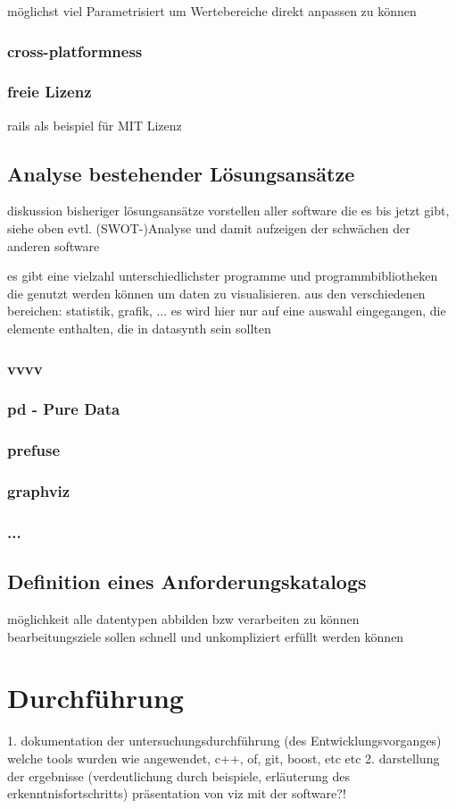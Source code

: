 \documentclass[a4paper, 12pt, onepage, pdftex, headsepline, footsepline]{scrreprt}
\begin{document}
möglichst viel Parametrisiert um Wertebereiche direkt anpassen zu können

\subsection{cross-platformness}
\subsection{freie Lizenz}
rails als beispiel für MIT Lizenz

\section{Analyse bestehender Lösungsansätze}
diskussion bisheriger lösungsansätze
vorstellen aller software die es bis jetzt gibt, siehe oben
evtl. (SWOT-)Analyse und damit aufzeigen der schwächen der anderen software

es gibt eine vielzahl unterschiedlichster programme und programmbibliotheken die genutzt werden können um daten zu visualisieren.
aus den verschiedenen bereichen: statistik, grafik, ...
es wird hier nur auf eine auswahl eingegangen, die elemente enthalten, die in datasynth sein sollten
\subsection{vvvv}
\subsection{pd - Pure Data}
\subsection{prefuse}
\subsection{graphviz}
\subsection{...}
\section{Definition eines Anforderungskatalogs}
möglichkeit alle datentypen abbilden bzw verarbeiten zu können
bearbeitungsziele sollen schnell und unkompliziert erfüllt werden können
\chapter{Durchführung}
1. dokumentation der untersuchungsdurchführung (des Entwicklungsvorganges)
welche tools wurden wie angewendet, c++, of, git, boost, etc etc
2. darstellung der ergebnisse (verdeutlichung durch beispiele, erläuterung des erkenntnisfortschritts)
präsentation von viz mit der software?!
\end{document}
